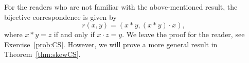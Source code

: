 
For the readers who are not familiar with the above-mentioned result, 
the bijective correspondence is given by 
\[
r(x,y)=(x*y,(x*y)\cdot x),
\]
where $x*y=z$ if and only if $x\cdot z=y$. We leave the proof for the reader, see 
Exercise~\ref{prob:CS}. However, we will prove a more 
general result in Theorem~\ref{thm:skewCS}. 

